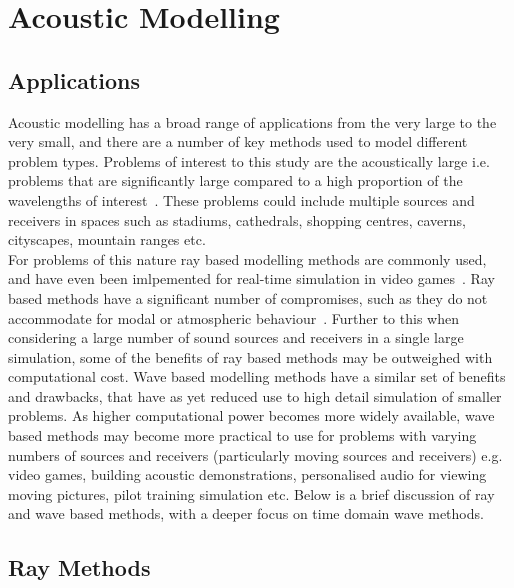 \documentclass{svproc}
\begin{document}

\section{Acoustic Modelling}
\subsection{Applications}
Acoustic modelling has a broad range of applications from the very large to the very small, and there are a number of key methods used to model different problem types. Problems of interest to this study are the acoustically large i.e. problems that are significantly large compared to a high proportion of the wavelengths of interest~\cite{Everest2009}. These problems could include multiple sources and receivers in spaces such as stadiums, cathedrals, shopping centres, caverns, cityscapes, mountain ranges etc.\\ For problems of this nature ray based modelling methods are commonly used, and have even been imlpemented for real-time simulation in video games~\cite{Bengtsson2009}. Ray based methods have a significant number of compromises, such as they do not accommodate for modal or atmospheric behaviour~\cite{Elorza2005}. Further to this when considering a large number of sound sources and receivers in a single large simulation, some of the benefits of ray based methods may be outweighed with computational cost. Wave based modelling methods have a similar set of benefits and drawbacks, that have as yet reduced use to high detail simulation of smaller problems. As higher computational power becomes more widely available, wave based methods may become more practical to use for problems with varying numbers of sources and receivers (particularly moving sources and receivers) e.g. video games, building acoustic demonstrations, personalised audio for viewing moving pictures, pilot training simulation etc. Below is a brief discussion of ray and wave based methods, with a deeper focus on time domain wave methods.

\subsection{Ray Methods}
\end{document}
